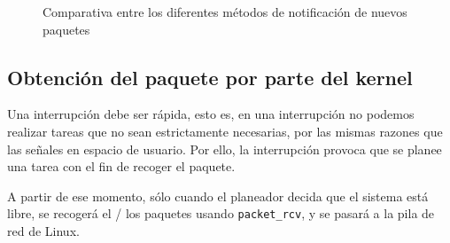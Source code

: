 \begin{figure}[hbtp]
\centering
{}%
\hspace{0.2\textwidth}
%
%
\caption{Comparativa entre los diferentes métodos de notificación de nuevos paquetes}
\end{figure}
%

\subsection{Obtención del paquete por parte del kernel}
Una interrupción debe ser rápida, esto es, en una interrupción no podemos realizar tareas que no sean estrictamente 
necesarias, por las mismas razones que las señales en espacio de usuario. Por ello, la interrupción provoca que se 
planee una tarea con el fin de recoger el paquete.

A partir de ese momento, sólo cuando el planeador decida que el sistema está libre, se recogerá el / los paquetes 
usando \texttt{packet\_rcv}, y se pasará a la pila de red de Linux.

